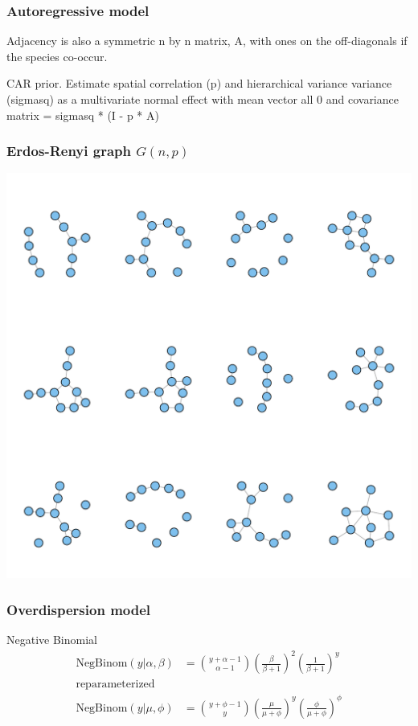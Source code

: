 \documentclass{beamer}
\begin{document}
\begin{frame}
  \frametitle{Autoregressive model}

  Adjacency is also a symmetric n by n matrix, A, with ones on the off-diagonals if the species co-occur.

  CAR prior. Estimate spatial correlation (p) and hierarchical variance variance (sigmasq) as a multivariate normal effect with mean vector all 0 and covariance matrix = sigmasq * (I - p * A)
\end{frame}

\begin{frame}
  \frametitle{Erdos-Renyi graph \(G(n, p)\)}
  \begin{center}
    \includegraphics[height = 0.8\textheight, width = \textwidth,  keepaspectratio = true]{figure/rng_graphs}
  \end{center}
\end{frame}

\begin{frame}
  \frametitle{Overdispersion model}

  \begin{block}{Negative Binomial}
    \begin{align*}
      \mathrm{NegBinom}(y | \alpha, \beta) &= {y + \alpha -1 \choose \alpha - 1} \left(\frac{\beta}{\beta + 1}\right)^{2} \left(\frac{1}{\beta + 1}\right)^{y} \\
      \mathrm{reparameterized} \\
      \mathrm{NegBinom}(y | \mu, \phi) &= {y + \phi -1 \choose y} \left(\frac{\mu}{\mu + \phi}\right)^{y} \left(\frac{\phi}{\mu + \phi}\right)^{\phi}
    \end{align*}
  \end{block}
\end{frame}
\end{document}
